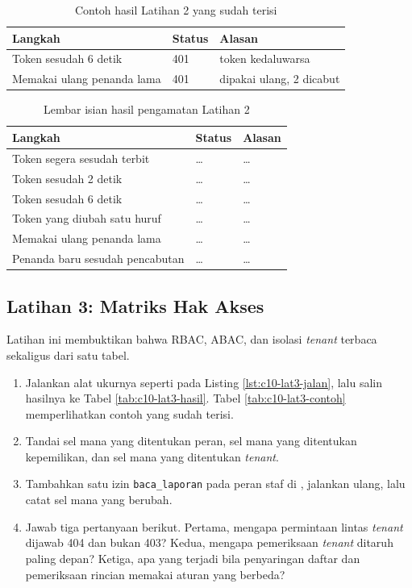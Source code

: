 \begin{table}[!htb]
  \centering
  \caption{Contoh hasil Latihan 2 yang sudah terisi}
  \label{tab:c10-lat2-contoh}
  \begin{tabularx}{\textwidth}{Xll}
    \hline
    \textbf{Langkah} & \textbf{Status} & \textbf{Alasan} \\
    \hline
    Token sesudah 6 detik & 401 & token kedaluwarsa \\
    \hline
    Memakai ulang penanda lama & 401 & dipakai ulang, 2 dicabut \\
    \hline
  \end{tabularx}
\end{table}

\begin{table}[!htb]
  \centering
  \caption{Lembar isian hasil pengamatan Latihan 2}
  \label{tab:c10-lat2-hasil}
  \begin{tabularx}{\textwidth}{Xll}
    \hline
    \textbf{Langkah} & \textbf{Status} & \textbf{Alasan} \\
    \hline
    Token segera sesudah terbit & \dots & \dots \\
    \hline
    Token sesudah 2 detik & \dots & \dots \\
    \hline
    Token sesudah 6 detik & \dots & \dots \\
    \hline
    Token yang diubah satu huruf & \dots & \dots \\
    \hline
    Memakai ulang penanda lama & \dots & \dots \\
    \hline
    Penanda baru sesudah pencabutan & \dots & \dots \\
    \hline
  \end{tabularx}
\end{table}

\subsection*{Latihan 3: Matriks Hak Akses}

Latihan ini membuktikan bahwa RBAC, ABAC, dan isolasi \textit{tenant}
terbaca sekaligus dari satu tabel.

\begin{enumerate}
  \item Jalankan alat ukurnya seperti pada Listing \ref{lst:c10-lat3-jalan},
        lalu salin hasilnya ke Tabel \ref{tab:c10-lat3-hasil}. Tabel
        \ref{tab:c10-lat3-contoh} memperlihatkan contoh yang sudah terisi.
  \item Tandai sel mana yang ditentukan peran, sel mana yang ditentukan
        kepemilikan, dan sel mana yang ditentukan \textit{tenant}.
  \item Tambahkan satu izin \texttt{baca\_laporan} pada peran staf di
        , jalankan ulang, lalu catat
        sel mana yang berubah.
  \item Jawab tiga pertanyaan berikut. Pertama, mengapa permintaan lintas
        \textit{tenant} dijawab 404 dan bukan 403? Kedua, mengapa
        pemeriksaan \textit{tenant} ditaruh paling depan? Ketiga, apa yang
        terjadi bila penyaringan daftar dan pemeriksaan rincian memakai
        aturan yang berbeda?
\end{enumerate}

